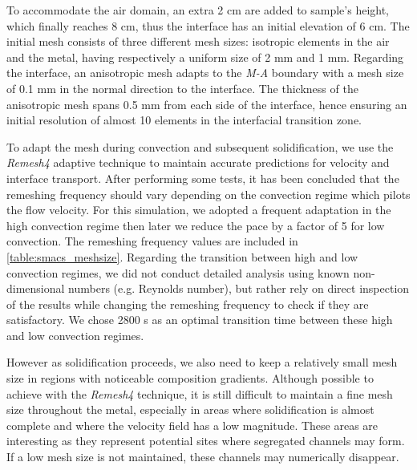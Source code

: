 To accommodate the air domain, an extra 2 cm are added to sample's height, which finally reaches 8 cm, thus the interface has an initial elevation of 6 cm. 
The initial mesh consists of three different mesh sizes: isotropic elements in the air and the metal, having respectively a uniform size of 2 mm and 1 mm.
Regarding the interface, an anisotropic mesh adapts to the \emph{M-A} boundary with a mesh size of 0.1 mm in the normal direction to the interface.
The thickness of the anisotropic mesh spans 0.5 mm from each side of the interface, hence ensuring an initial resolution of almost 10 elements in the interfacial transition zone.

To adapt the mesh during convection and subsequent solidification, we use the \emph{Remesh4} adaptive technique to maintain accurate predictions for velocity and interface transport.
After performing some tests, it has been concluded that the remeshing
frequency should vary depending on the convection regime which pilots the flow velocity.
For this simulation, we adopted a frequent adaptation in the high convection regime
then later we reduce the pace by a factor of 5 for low convection. The remeshing frequency values are included in \cref{table:smacs_meshsize}. 
Regarding the transition between high and low convection regimes, we did not conduct detailed analysis using 
known non-dimensional numbers (e.g. Reynolds number), but rather rely on direct inspection of the results while changing the remeshing frequency
to check if they are satisfactory. We chose 2800 s as an optimal transition time between these high and low convection regimes.

However as solidification proceeds, we also need to keep a relatively small mesh size in regions with noticeable composition gradients.
Although possible to achieve with the \emph{Remesh4} technique, it is still difficult to maintain a fine mesh size throughout the metal, especially in areas
where solidification is almost complete and where the velocity field has a low magnitude. These areas are interesting as they represent potential
sites where segregated channels may form. If a low mesh size is not maintained, these channels may numerically disappear. 

